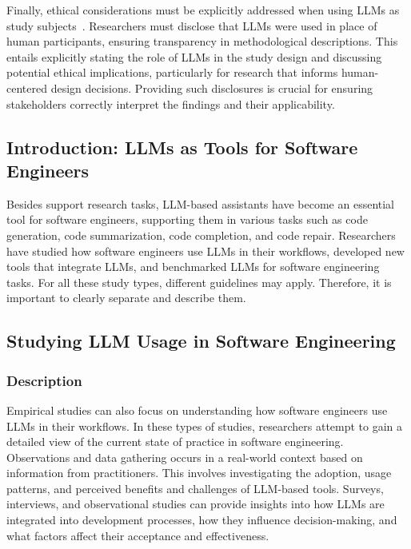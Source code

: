 Finally, ethical considerations must be explicitly addressed when using LLMs as study subjects~\cite{DBLP:journals/jss/RussoBBACCCCEFHHIKKLLLMMMOPPPPRRSSS24}. Researchers must disclose that LLMs were used in place of human participants, ensuring transparency in methodological descriptions. This entails explicitly stating the role of LLMs in the study design and discussing potential ethical implications, particularly for research that informs human-centered design decisions. Providing such disclosures is crucial for ensuring stakeholders correctly interpret the findings and their applicability.

\subsection{Introduction: LLMs as Tools for Software Engineers}

Besides support research tasks, LLM-based assistants have become an essential tool for software engineers, supporting them in various tasks such as code generation, code summarization, code completion, and code repair.
Researchers have studied how software engineers use LLMs in their workflows, developed new tools that integrate LLMs, and benchmarked LLMs for software engineering tasks.
For all these study types, different guidelines may apply.
Therefore, it is important to clearly separate and describe them. 

\subsection{Studying LLM Usage in Software Engineering}

\subsubsection{Description}

Empirical studies can also focus on understanding how software engineers use LLMs in their workflows.
In these types of studies, researchers attempt to gain a detailed view of the current state of practice in software engineering.
Observations and data gathering occurs in a real-world context based on information from practitioners.
This involves investigating the adoption, usage patterns, and perceived benefits and challenges of LLM-based tools.
Surveys, interviews, and observational studies can provide insights into how LLMs are integrated into development processes, how they influence decision-making, and what factors affect their acceptance and effectiveness. 


